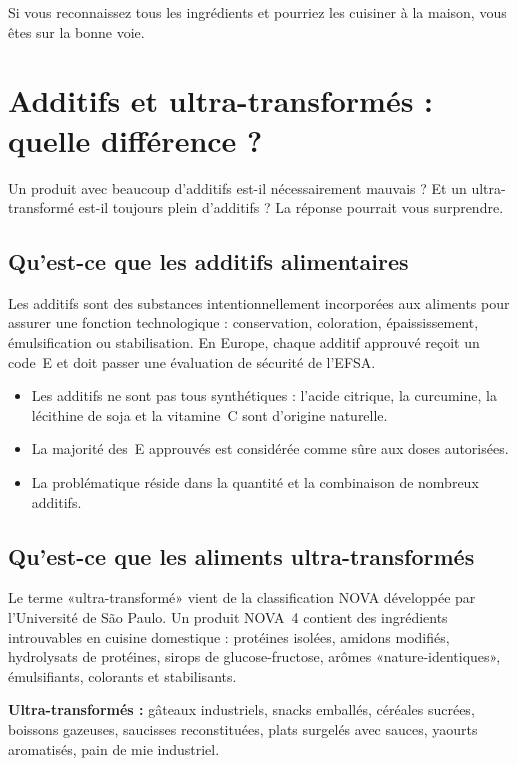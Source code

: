 \documentclass[a5paper,12pt,oneside,openany]{book}
\newcommand{\boxvert}[2]{%
  \begin{tcolorbox}[boitebase,
    colback=verdescuro!8!white, colframe=verdescuro, title={#1}]
  #2\end{tcolorbox}}
\begin{document}
\boxvert{L'astuce la plus simple}{Si vous reconnaissez tous les ingrédients et
pourriez les cuisiner à la maison, vous êtes sur la bonne voie.}

\chapter{Additifs et ultra-transformés : quelle différence ?}

Un produit avec beaucoup d'additifs est-il nécessairement mauvais ? Et un
ultra-transformé est-il toujours plein d'additifs ? La réponse pourrait vous
surprendre.

\section{Qu'est-ce que les additifs alimentaires}

Les additifs sont des substances intentionnellement incorporées aux aliments pour
assurer une fonction technologique : conservation, coloration, épaississement,
émulsification ou stabilisation. En Europe, chaque additif approuvé reçoit un
code~E et doit passer une évaluation de sécurité de l'EFSA.

\begin{itemize}
  \item Les additifs ne sont pas tous synthétiques : l'acide citrique, la
    curcumine, la lécithine de soja et la vitamine~C sont d'origine naturelle.
  \item La majorité des~E approuvés est considérée comme sûre aux doses
    autorisées.
  \item La problématique réside dans la quantité et la combinaison de nombreux
    additifs.
\end{itemize}

\section{Qu'est-ce que les aliments ultra-transformés}

Le terme «ultra-transformé» vient de la classification NOVA développée par
l'Université de São Paulo. Un produit NOVA~4 contient des ingrédients
introuvables en cuisine domestique : protéines isolées, amidons modifiés,
hydrolysats de protéines, sirops de glucose-fructose, arômes «nature-identiques»,
émulsifiants, colorants et stabilisants.

\textbf{Ultra-transformés :} gâteaux industriels, snacks emballés, céréales
sucrées, boissons gazeuses, saucisses reconstituées, plats surgelés avec
sauces, yaourts aromatisés, pain de mie industriel.
\end{document}
